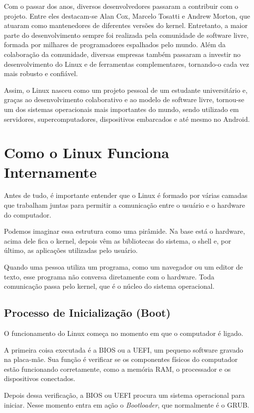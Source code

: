 \documentclass{article}
\begin{document}
Com o passar dos anos, diversos desenvolvedores passaram a contribuir com o projeto. Entre eles destacam-se Alan Cox, Marcelo Tosatti e Andrew Morton, que atuaram como mantenedores de diferentes versões do kernel. Entretanto, a maior parte do desenvolvimento sempre foi realizada pela comunidade de software livre, formada por milhares de programadores espalhados pelo mundo.
Além da colaboração da comunidade, diversas empresas também passaram a investir no desenvolvimento do Linux e de ferramentas complementares, tornando-o cada vez mais robusto e confiável.

Assim, o Linux nasceu como um projeto pessoal de um estudante universitário e, graças ao desenvolvimento colaborativo e ao modelo de software livre, tornou-se um dos sistemas operacionais mais importantes do mundo, sendo utilizado em servidores, supercomputadores, dispositivos embarcados e até mesmo no Android.



\section{Como o Linux Funciona Internamente}
Antes de tudo, é importante entender que o Linux é formado por várias camadas que trabalham juntas para permitir a comunicação entre o usuário e o hardware do computador.

Podemos imaginar essa estrutura como uma pirâmide. Na base está o hardware, acima dele fica o kernel, depois vêm as bibliotecas do sistema, o shell e, por último, as aplicações utilizadas pelo usuário.

Quando uma pessoa utiliza um programa, como um navegador ou um editor de texto, esse programa não conversa diretamente com o hardware. Toda comunicação passa pelo kernel, que é o núcleo do sistema operacional.

\subsection{Processo de Inicialização (Boot)}

O funcionamento do Linux começa no momento em que o computador é ligado.

A primeira coisa executada é a BIOS ou a UEFI, um pequeno software gravado na placa-mãe. Sua função é verificar se os componentes físicos do computador estão funcionando corretamente, como a memória RAM, o processador e os dispositivos conectados.

Depois dessa verificação, a BIOS ou UEFI procura um sistema operacional para iniciar. Nesse momento entra em ação o \textit{Bootloader}, que normalmente é o GRUB.
\end{document}
